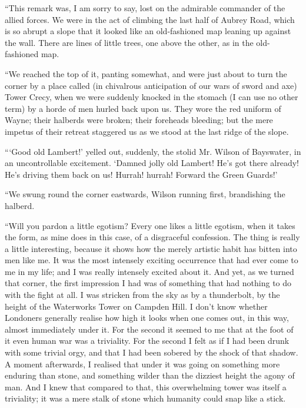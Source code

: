 \documentclass{book}
\begin{document}
“This remark was, I am sorry to say, lost on the admirable commander of the allied forces. We were in the act of climbing the last half of Aubrey Road, which is so abrupt a slope that it looked like an old-fashioned map leaning up against the wall. There are lines of little trees, one above the other, as in the old-fashioned map.

“We reached the top of it, panting somewhat, and were just about to turn the corner by a place called (in chivalrous anticipation of our wars of sword and axe) Tower Crecy, when we were suddenly knocked in the stomach (I can use no other term) by a horde of men hurled back upon us. They wore the red uniform of Wayne; their halberds were broken; their foreheads bleeding; but the mere impetus of their retreat staggered us as we stood at the last ridge of the slope.

“‘Good old Lambert!’ yelled out, suddenly, the stolid Mr. Wilson of Bayswater, in an uncontrollable excitement. ‘Damned jolly old Lambert! He’s got there already! He’s driving them back on us! Hurrah! hurrah! Forward the Green Guards!’

“We swung round the corner eastwards, Wilson running first, brandishing the halberd.

“Will you pardon a little egotism? Every one likes a little egotism, when it takes the form, as mine does in this case, of a disgraceful confession. The thing is really a little interesting, because it shows how the merely artistic habit has bitten into men like me. It was the most intensely exciting occurrence that had ever come to me in my life; and I was really intensely excited about it. And yet, as we turned that corner, the first impression I had was of something that had nothing to do with the fight at all. I was stricken from the sky as by a thunderbolt, by the height of the Waterworks Tower on Campden Hill. I don’t know whether Londoners generally realise how high it looks when one comes out, in this way, almost immediately under it. For the second it seemed to me that at the foot of it even human war was a triviality. For the second I felt as if I had been drunk with some trivial orgy, and that I had been sobered by the shock of that shadow. A moment afterwards, I realised that under it was going on something more enduring than stone, and something wilder than the dizziest height the agony of man. And I knew that compared to that, this overwhelming tower was itself a triviality; it was a mere stalk of stone which humanity could snap like a stick.
\end{document}

